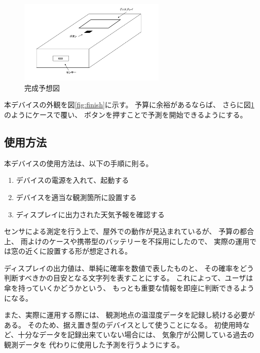 \documentclass{jsarticle}
\begin{document}
        \begin{figure}[htbp]
          \begin{center}
            \includegraphics[clip,width=7.0cm]{img/finish2}
            \caption{完成予想図}
            \label{fig:finish2}
          \end{center}
        \end{figure}

        本デバイスの外観を図\ref{fig:finish}に示す。
        予算に余裕があるならば、
        さらに図\ref{fig:finish2}のようにケースで覆い、
        ボタンを押すことで予測を開始できるようにする。

      \subsection{使用方法}
        本デバイスの使用方法は、以下の手順に則る。
        
        \begin{enumerate}
          \item デバイスの電源を入れて、起動する
          \item デバイスを適当な観測箇所に設置する
          \item ディスプレイに出力された天気予報を確認する
        \end{enumerate}
        
        センサによる測定を行う上で、屋外での動作が見込まれているが、
        予算の都合上、
        雨よけのケースや携帯型のバッテリーを不採用にしたので、
        実際の運用では窓の近くに設置する形が想定される。
        
        ディスプレイの出力値は、単純に確率を数値で表したものと、
        その確率をどう判断すべきかの目安となる文字列を表すことにする。
        これによって、ユーザは傘を持っていくかどうかという、
        もっとも重要な情報を即座に判断できるようになる。

        また、実際に運用する際には、
        観測地点の温湿度データを記録し続ける必要がある。
        そのため、据え置き型のデバイスとして使うことになる。
        初使用時など、十分なデータを記録出来ていない場合には、
        気象庁が公開している過去の観測データを
        代わりに使用した予測を行うようにする。
\end{document}
